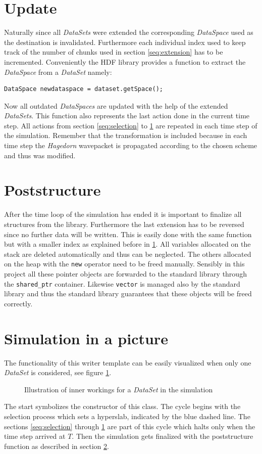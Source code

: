 \section{Update}
\label{seq:update}
Naturally since all \textit{DataSets} were extended the corresponding \textit{DataSpace} used as the destination is invalidated. Furthermore each individual index used to keep track of the number of chunks used in section \ref{seq:extension} has to be incremented. Conveniently the HDF library provides a function to extract the \textit{DataSpace} from a \textit{DataSet} namely:
\begin{lstlisting}
DataSpace newdataspace = dataset.getSpace();
\end{lstlisting}
Now all outdated \textit{DataSpaces} are updated with the help of the extended \textit{DataSets}. This function also represents the last action done in the current time step. All actions from section \ref{seq:selection} to \ref{seq:update} are repeated in each time step of the simulation. Remember that the transformation is included because in each time step the \textit{Hagedorn} wavepacket is propagated according to the chosen scheme and thus was modified.

\section{Poststructure}
\label{seq:poststructure}
After the time loop of the simulation has ended it is important to finalize all structures from the library. Furthermore the last extension has to be reversed since no further data will be written. This is easily done with the same function but with a smaller index as explained before in \ref{seq:update}. All variables allocated on the stack are deleted automatically and thus can be neglected. The others allocated on the heap with the \texttt{new} operator need to be freed manually. Sensibly in this project all these pointer objects are forwarded to the standard library through the \texttt{shared\_ptr} container. Likewise \texttt{vector} is managed also by the standard library and thus the standard library guarantees that these objects will be freed correctly.

\section{Simulation in a picture}
The functionality of this writer template can be easily visualized when only one \textit{DataSet} is considered, see figure \ref{fig:illustration}.
\begin{figure}[ht!]
\caption{Illustration of inner workings for a \textit{DataSet} in the simulation}
\label{fig:illustration}
\end{figure}
The start symbolizes the constructor of this class. The cycle begins with the selection process which sets a hyperslab, indicated by the blue dashed line. The sections \ref{seq:selection} through \ref{seq:update} are part of this cycle which halts only when the time step arrived at $T$. Then the simulation gets finalized with the poststructure function as described in section \ref{seq:poststructure}.

